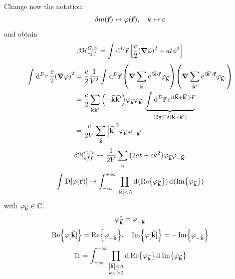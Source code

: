 \documentclass[../main/main.tex]{subfiles}
\begin{document}
Change now the notation:
\begin{equation}
  \delta m (\va{r}) \leftrightarrow \varphi (\va{r}), \quad k \leftrightarrow c
\end{equation}
and obtain
\begin{equation}
  \beta \mathcal{H}_{eff}^{G,>} = \int_{}^{} \dd[D]{\va{r}} \qty[\frac{c}{2} \qty(\grad \phi )^2 + a t \phi ^2 ]
\end{equation}
\begin{equation}
\begin{split}
  \int_{}^{} \dd[D]{r} \frac{c}{2} \qty(\grad \varphi )^2 & = \frac{c}{2} \frac{1}{V^2} \int_{}^{} \dd[D]{\va{r}} \qty(\grad \sum_{\va{k}}^{} e^{i \va{k} \vdot \va{r}} \varphi _{\va{k}}  ) \qty(\grad \sum_{\va{k}'}^{} e^{i \va{k}' \vdot \va{r} } \varphi _{\va{k}'}  )     \\
  & = \frac{c}{2} \sum_{\va{k} \va{k}'}^{}  \qty(- \va{k} \va{k}') \varphi _{\va{k}} \varphi _{\va{k}'} \underbrace{\int_{}^{} \dd[D]{\va{r}}  e^{i (\va{k}+\va{k}')\vdot \va{r}}}_{(2 \pi )^2 \delta (\va{k}+ \va{k}')}   \\
  & = \frac{c}{2V} \sum_{\va{k}}^{} \abs{\va{k}}^2 \varphi _{\va{k}} \varphi _{\va{-k}'}
\end{split}
\end{equation}
\begin{equation}
  \beta \mathcal{H}_{eff}^{G,>} \rightarrow \frac{1}{2V} \sum_{\va{k}}^{} \qty(2 a t + c k^2) \varphi _{\va{k}} \varphi _{-\va{k}'}
\end{equation}
\begin{equation}
  \int_{}^{} \text{D} \qty[\varphi (\va{r})] \rightarrow \int_{- \infty }^{+ \infty } \prod_{\abs{\va{k}} < \Lambda  }^{}   \dd[]{(\Re{\varphi _{\va{k}}})}   \dd[]{(\Im{\varphi _{\va{k}}})}
\end{equation}
with \( \varphi _{\va{k}} \in \mathbb{C} \).
\begin{equation}
  \varphi _{\va{k}}^* = \varphi _{-\va{k}}
\end{equation}
\begin{equation}
  \Re {\varphi _[\va{k}]} = \Re {\varphi _{-\va{k}}}, \quad   \Im{\varphi _[\va{k}]} = -\Im {\varphi _{-\va{k}}}
\end{equation}
\begin{equation}
  \Tr = \int_{- \infty }^{+ \infty } \prod_{\substack{ \abs{\va{k}} < \Lambda   \\ k_D > 0 } }^{}   \dd[]{\Re {\varphi _{\va{k}}}}  \dd[]{\Im {\varphi _{\va{k}}}}
\end{equation}
\end{document}
